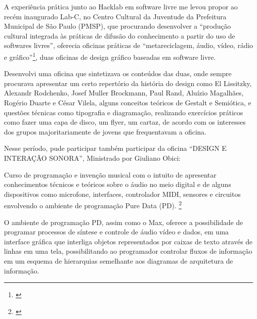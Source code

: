 A experiência prática junto ao Hacklab em software livre me levou propor ao recém inaugurado Lab-C, no Centro Cultural da Juventude da Prefeitura Municipal de São Paulo (PMSP), que procurando desenvolver a ``produção cultural integrada às práticas de difusão do conhecimento a partir do uso de softwares livres'', oferecia oficinas práticas de ``metareciclagem, áudio, vídeo, rádio e gráfico''\footnote{\cite{PMSP2008}}, duas oficinas de design gráfico baseadas em software livre.  

Desenvolvi uma oficina que sintetizava os conteúdos das duas, onde sempre procurava apresentar um certo repertório da história do design como El Lissitzky, Alexandr Rodchenko, Josef Muller Brockmann, Paul Rand, Aluízio Magalhães, Rogério Duarte e César Vilela, alguns conceitos teóricos de Gestalt e Semiótica, e questões técnicas como tipografia e diagramação, realizando exercícios práticos como fazer uma capa de disco, um flyer, um cartaz, de acordo com os interesses dos grupos majoritariamente de jovens que frequentavam a oficina. 

Nesse período, pude participar também participar da oficina ``DESIGN E INTERAÇÃO SONORA'', Ministrado por Giuliano Obici:
\begin{citacao}
Curso de programação e invenção musical com o intuito de apresentar conhecimentos técnicos e teóricos sobre o áudio no meio digital e de alguns dispositivos como microfone, interfaces, controlador MIDI, sensores e circuitos envolvendo o ambiente de programação Pure Data (PD). \footnote{\cite{PMSP2008}}
\end{citacao}

O ambiente de programação PD, assim como o Max, oferece a possibilidade de programar processos de síntese e controle de áudio vídeo e dados, em uma interface gráfica que interliga objetos representados por caixas de texto através de linhas em uma tela, possibilitando ao programador controlar fluxos de informação em um esquema de hierarquias semelhante aos diagramas de arquitetura de informação. 

